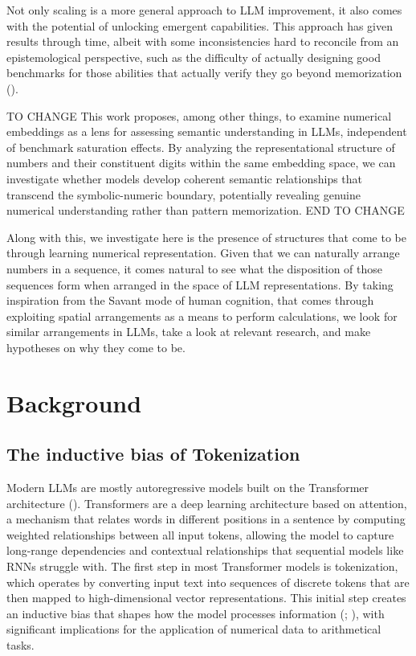 \documentclass[
  a4paper, twoside, 10pt, titlepage]{book}
\begin{document}
Not only scaling is a more general approach to LLM improvement, it also
comes with the potential of unlocking emergent capabilities. This
approach has given results through time, albeit with some
inconsistencies hard to reconcile from an epistemological perspective,
such as the difficulty of actually designing good benchmarks for those
abilities that actually verify they go beyond memorization
().

TO CHANGE This work proposes, among other things, to examine numerical
embeddings as a lens for assessing semantic understanding in LLMs,
independent of benchmark saturation effects. By analyzing the
representational structure of numbers and their constituent digits
within the same embedding space, we can investigate whether models
develop coherent semantic relationships that transcend the
symbolic-numeric boundary, potentially revealing genuine numerical
understanding rather than pattern memorization. END TO CHANGE

Along with this, we investigate here is the presence of structures that
come to be through learning numerical representation. Given that we can
naturally arrange numbers in a sequence, it comes natural to see what
the disposition of those sequences form when arranged in the space of
LLM representations. By taking inspiration from the Savant mode of human
cognition, that comes through exploiting spatial arrangements as a means
to perform calculations, we look for similar arrangements in LLMs, take
a look at relevant research, and make hypotheses on why they come to be.

\chapter{Background}\label{background}

\section{The inductive bias of
Tokenization}\label{the-inductive-bias-of-tokenization}

Modern LLMs are mostly autoregressive models built on the Transformer
architecture ().
Transformers are a deep learning architecture based on attention, a
mechanism that relates words in different positions in a sentence by
computing weighted relationships between all input tokens, allowing the
model to capture long-range dependencies and contextual relationships
that sequential models like RNNs struggle with. The first step in most
Transformer models is tokenization, which operates by converting input
text into sequences of discrete tokens that are then mapped to
high-dimensional vector representations. This initial step creates an
inductive bias that shapes how the model processes information
(;
), with significant
implications for the application of numerical data to arithmetical
tasks.
\end{document}
